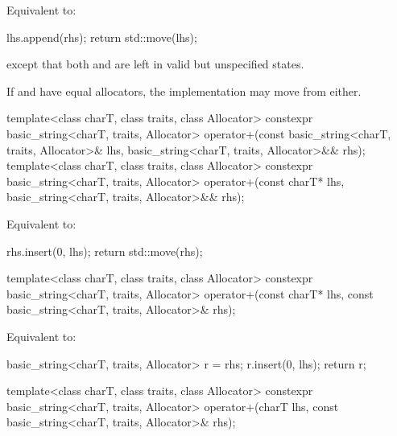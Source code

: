 \begin{itemdescr}
\pnum
\effects
Equivalent to:
\begin{codeblock}
lhs.append(rhs);
return std::move(lhs);
\end{codeblock}
except that both  and 
are left in valid but unspecified states.
\begin{note}
If  and  have equal allocators,
the implementation may move from either.
\end{note}
\end{itemdescr}

%
\begin{itemdecl}
template<class charT, class traits, class Allocator>
  constexpr basic_string<charT, traits, Allocator>
    operator+(const basic_string<charT, traits, Allocator>& lhs,
              basic_string<charT, traits, Allocator>&& rhs);
template<class charT, class traits, class Allocator>
  constexpr basic_string<charT, traits, Allocator>
    operator+(const charT* lhs, basic_string<charT, traits, Allocator>&& rhs);
\end{itemdecl}

\begin{itemdescr}
\pnum
\effects
Equivalent to:
\begin{codeblock}
rhs.insert(0, lhs);
return std::move(rhs);
\end{codeblock}
\end{itemdescr}

%
\begin{itemdecl}
template<class charT, class traits, class Allocator>
  constexpr basic_string<charT, traits, Allocator>
    operator+(const charT* lhs, const basic_string<charT, traits, Allocator>& rhs);
\end{itemdecl}

\begin{itemdescr}
\pnum
\effects
Equivalent to:
\begin{codeblock}
basic_string<charT, traits, Allocator> r = rhs;
r.insert(0, lhs);
return r;
\end{codeblock}
\end{itemdescr}

%
\begin{itemdecl}
template<class charT, class traits, class Allocator>
  constexpr basic_string<charT, traits, Allocator>
    operator+(charT lhs, const basic_string<charT, traits, Allocator>& rhs);
\end{itemdecl}

